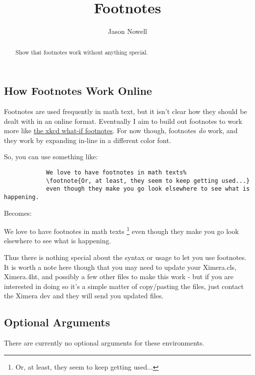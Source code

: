 \documentclass{ximera}
\title{Footnotes}
\author{Jason Nowell}
\begin{document}
\begin{abstract}
    Show that footnotes work without anything special.
\end{abstract}
\maketitle

    \subsection*{How Footnotes Work Online}
        Footnotes are used frequently in math text, but it isn't clear how they should be dealt with in an online format. Eventually I aim to build out footnotes to work more like \href{https://what-if.xkcd.com/}{the xkcd what-if footnotes}. For now though, footnotes \textit{do} work, and they work by expanding in-line in a different color font.
        
        So, you can use something like:
        
        \begin{verbatim}
            We love to have footnotes in math texts%
            \footnote{Or, at least, they seem to keep getting used...}
            even though they make you go look elsewhere to see what is happening.
        \end{verbatim}
        
        Becomes:
        
        We love to have footnotes in math texts%
        \footnote{Or, at least, they seem to keep getting used...}
        even though they make you go look elsewhere to see what is happening.
        
        Thus there is nothing special about the syntax or usage to let you use footnotes. It is worth a note here though that you may need to update your Ximera.cls, Ximera.4ht, and possibly a few other files to make this work - but if you are interested in doing so it's a simple matter of copy/pasting the files, just contact the Ximera dev and they will send you updated files.


        
    \subsection*{Optional Arguments}
        There are currently no optional arguments for these environments.
\end{document}
